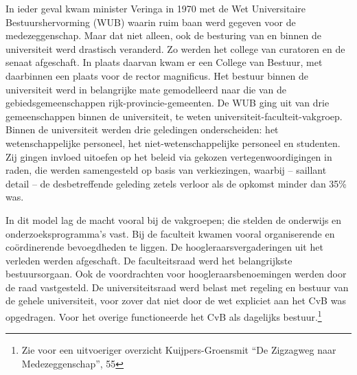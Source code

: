 \documentclass{jote-book}
\begin{document}
	In ieder geval kwam minister Veringa in 1970 met de Wet Universitaire Bestuurshervorming (WUB) waarin ruim baan werd gegeven voor de medezeggenschap. Maar dat niet alleen, ook de besturing van en binnen de universiteit werd drastisch veranderd. Zo werden het college van curatoren en de senaat afgeschaft. In plaats daarvan kwam er een College van Bestuur, met daarbinnen een plaats voor de rector magnificus. Het bestuur binnen de universiteit werd in belangrijke mate gemodelleerd naar die van de gebiedsgemeenschappen rijk-provincie-gemeenten. De WUB ging uit van drie gemeenschappen binnen de universiteit, te weten universiteit-faculteit-vakgroep. Binnen de universiteit werden drie geledingen onderscheiden: het wetenschappelijke personeel, het niet-wetenschappelijke personeel en studenten. Zij gingen invloed uitoefen op het beleid via gekozen vertegenwoordigingen in raden, die werden samengesteld op basis van verkiezingen, waarbij -- saillant detail -- de desbetreffende geleding zetels verloor als de opkomst minder dan 35\% was.



	In dit model lag de macht vooral bij de vakgroepen; die stelden de onderwijs en onderzoeksprogramma's vast. Bij de faculteit kwamen vooral organiserende en coördinerende bevoegdheden te liggen. De hoogleraarsvergaderingen uit het verleden werden afgeschaft. De faculteitsraad werd het belangrijkste bestuursorgaan. Ook de voordrachten voor hoogleraarsbenoemingen werden door de raad vastgesteld. De universiteitsraad werd belast met regeling en bestuur van de gehele universiteit, voor zover dat niet door de wet expliciet aan het CvB was opgedragen. Voor het overige functioneerde het CvB als dagelijks bestuur.\footnote{Zie voor een uitvoeriger overzicht Kuijpers-Groensmit “De Zigzagweg naar Medezeggenschap”, 55}
\end{document}
